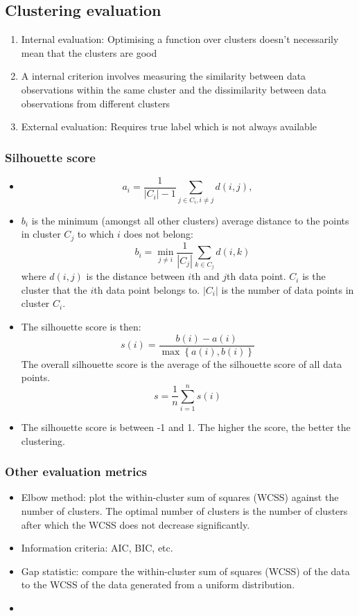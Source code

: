 \documentclass[12pt,a4paper]{article}
\begin{document}
\subsection{Clustering evaluation}
\begin{enumerate}
    \item Internal evaluation: Optimising a function over clusters doesn’t necessarily mean that the clusters are good
    \item A internal criterion involves measuring the similarity between data observations within the same cluster and the dissimilarity between data observations from different clusters
    \item External evaluation: Requires true label which is not always available 
\end{enumerate}
\subsubsection{Silhouette score}
\begin{itemize}
    \item $$
    a_i=\frac{1}{\left|C_i\right|-1} \sum_{j \in C_i, i \neq j} d(i, j), 
    $$
    \item $b_i$ is the minimum (amongst all other clusters) average distance to the points in cluster $C_j$ to which $i$ does not belong:
    $$
    \quad b_i=\min _{j \neq i} \frac{1}{\left|C_j\right|} \sum_{k \in C_j} d(i, k)
    $$
    where $d(i, j)$ is the distance between $i$th and $j$th data point. $C_i$ is the cluster that the $i$th data point belongs to. $|C_i|$ is the number of data points in cluster $C_i$.
    \item The silhouette score is then:
    $$
    s(i)=\frac{b(i)-a(i)}{\max \left\{a(i), b(i)\right\}}
    $$
    The overall silhouette score is the average of the silhouette score of all data points.
    $$
    s=\frac{1}{n} \sum_{i=1}^{n} s(i)
    $$
    \item The silhouette score is between -1 and 1. The higher the score, the better the clustering.
\end{itemize}
\subsubsection{Other evaluation metrics}
\begin{itemize}
    \item Elbow method: plot the within-cluster sum of squares (WCSS) against the number of clusters. The optimal number of clusters is the number of clusters after which the WCSS does not decrease significantly.
    \item Information criteria: AIC, BIC, etc.
    \item Gap statistic: compare the within-cluster sum of squares (WCSS) of the data to the WCSS of the data generated from a uniform distribution.
    \item 
\end{itemize}
\end{document}
